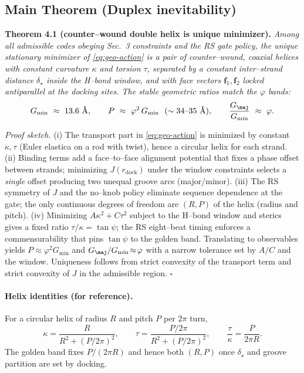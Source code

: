 \documentclass[11pt]{article}
\begin{document}
\subsection{Main Theorem (Duplex inevitability)}
\textbf{Theorem 4.1 (counter–wound double helix is unique minimizer).}
\emph{Among all admissible codes obeying Sec.~3 constraints and the RS gate policy, the unique stationary minimizer of \eqref{eq:geo-action} is a pair of counter–wound, coaxial helices with constant curvature $\kappa$ and torsion $\tau$, separated by a constant inter–strand distance $\delta_\star$ inside the H–bond window, and with face vectors $\mathbf{f}_1,\mathbf{f}_2$ locked antiparallel at the docking sites. The stable geometric ratios match the $\varphi$ bands:}
\[
G_{\min}\ \approx\ 13.6~\text{\AA},\qquad
P\ \approx\ \varphi^{2}\,G_{\min}\ \ (\sim 34\text{--}35~\text{\AA}),\qquad
\frac{G_{\maj}}{G_{\min}}\ \approx\ \varphi.
\]

\emph{Proof sketch.}
(i) The transport part in \eqref{eq:geo-action} is minimized by constant $\kappa,\tau$ (Euler elastica on a rod with twist), hence a circular helix for each strand. (ii) Binding terms add a face–to–face alignment potential that fixes a phase offset between strands; minimizing $J(r_{\mathrm{dock}})$ under the window constraints selects a \emph{single} offset producing two unequal groove arcs (major/minor). (iii) The RS symmetry of $J$ and the no–knob policy eliminate sequence dependence at the gate; the only continuous degrees of freedom are $(R,P)$ of the helix (radius and pitch). (iv) Minimizing $A\kappa^2+C\tau^2$ subject to the H–bond window and sterics gives a fixed ratio $\tau/\kappa=\tan\psi$; the RS eight–beat timing enforces a commensurability that pins $\tan\psi$ to the golden band. Translating to observables yields $P\!\approx\!\varphi^2 G_{\min}$ and $G_{\maj}/G_{\min}\!\approx\!\varphi$ with a narrow tolerance set by $A/C$ and the window. Uniqueness follows from strict convexity of the transport term and strict convexity of $J$ in the admissible region. \hfill$\square$

\paragraph{Helix identities (for reference).}
For a circular helix of radius $R$ and pitch $P$ per $2\pi$ turn,
\[
\kappa=\frac{R}{R^2+(P/2\pi)^2},\qquad
\tau=\frac{P/2\pi}{R^2+(P/2\pi)^2},\qquad
\frac{\tau}{\kappa}=\frac{P}{2\pi R}.
\]
The golden band fixes $P/(2\pi R)$ and hence both $(R,P)$ once $\delta_\star$ and groove partition are set by docking.
\end{document}
